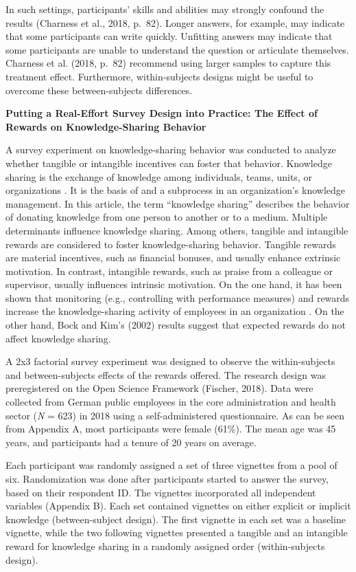 \documentclass{article}
\begin{document}
In such settings, participants' skills and abilities may strongly confound the results (Charness et al., 2018, p. 82). Longer answers, for example, may indicate that some participants can write quickly. Unfitting answers may indicate that some participants are unable to understand the question or articulate themselves. Charness et al. (2018, p. 82) recommend using larger samples to capture this treatment effect. Furthermore, within-subjects designs might be useful to overcome these between-subjects differences.

\textbf{Putting a Real-Effort Survey Design into Practice: The Effect of Rewards on Knowledge-Sharing Behavior}

A survey experiment on knowledge-sharing behavior was conducted to analyze whether tangible or intangible incentives can foster that behavior. Knowledge sharing is the exchange of knowledge among individuals, teams, units, or organizations \parencite{Paulin2012}. It is the basis of and a subprocess in an organization's knowledge management. In this article, the term “knowledge sharing” describes the behavior of donating knowledge from one person to another or to a medium. Multiple determinants influence knowledge sharing. Among others, tangible and intangible rewards are considered to foster knowledge-sharing behavior. Tangible rewards are material incentives, such as financial bonuses, and usually enhance extrinsic motivation. In contrast, intangible rewards, such as praise from a colleague or supervisor, usually influences intrinsic motivation. On the one hand, it has been shown that monitoring (e.g., controlling with performance measures) and rewards increase the knowledge-sharing activity of employees in an organization \parencite{Wang2011, Witherspoon2013}. On the other hand, Bock and Kim's (2002) results suggest that expected rewards do not affect knowledge sharing.

A 2x3 factorial survey experiment was designed to observe the within-subjects and between-subjects effects of the rewards offered. The research design was preregistered on the Open Science Framework (Fischer, 2018). Data were collected from German public employees in the core administration and health sector (\emph{N} = 623) in 2018 using a self-administered questionnaire. As can be seen from Appendix A, most participants were female (61\%). The mean age was 45 years, and participants had a tenure of 20 years on average.

Each participant was randomly assigned a set of three vignettes from a pool of six. Randomization was done after participants started to answer the survey, based on their respondent ID. The vignettes incorporated all independent variables (Appendix B). Each set contained vignettes on either explicit or implicit knowledge (between-subject design). The first vignette in each set was a baseline vignette, while the two following vignettes presented a tangible and an intangible reward for knowledge sharing in a randomly assigned order (within-subjects design).
\end{document}
